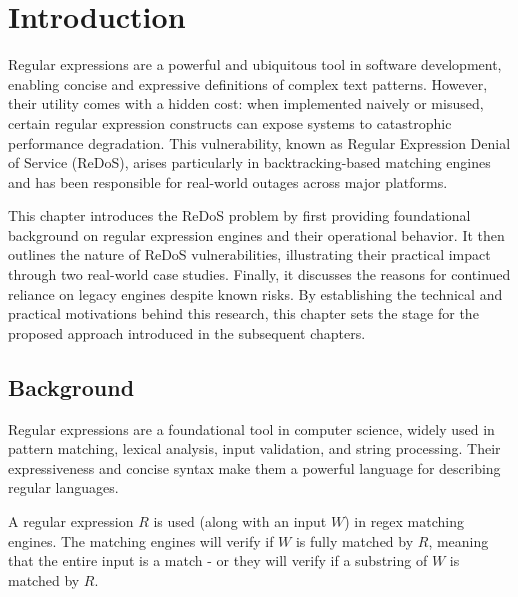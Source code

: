 \chapter{Introduction}\label{chap:intro}


Regular expressions are a powerful and ubiquitous tool in software development, enabling concise and expressive definitions of complex text patterns. However, their utility comes with a hidden cost: when implemented naively or misused, certain regular expression constructs can expose systems to catastrophic performance degradation. This vulnerability, known as Regular Expression Denial of Service (ReDoS), arises particularly in backtracking-based matching engines and has been responsible for real-world outages across major platforms. 

This chapter introduces the ReDoS problem by first providing foundational background on regular expression engines and their operational behavior. It then outlines the nature of ReDoS vulnerabilities, illustrating their practical impact through two real-world case studies. Finally, it discusses the reasons for continued reliance on legacy engines despite known risks. By establishing the technical and practical motivations behind this research, this chapter sets the stage for the proposed approach introduced in the subsequent chapters.

\section{Background}
Regular expressions are a foundational tool in computer science, widely used in pattern matching, lexical analysis, input validation, and string processing. Their expressiveness and concise syntax make them a powerful language for describing regular languages.


A regular expression $R$ is used (along with an input $W$) in regex matching engines. The matching engines will verify if $W$ is fully matched by $R$, meaning that the entire input is a match - or they will verify if a substring of $W$ is matched by $R$. 


